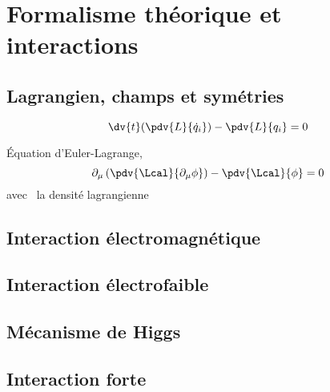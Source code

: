 \section{Formalisme théorique et interactions}
\subsection{Lagrangien, champs et symétries}
\begin{equation}
\dv{t}(\pdv{L}{\dot{q}_i})-\pdv{L}{q_i}=0
\end{equation}

Équation d'Euler-Lagrange,
\begin{equation}
\partial_\mu\left(\pdv{\Lcal}{\partial_\mu \phi} \right) - \pdv{\Lcal}{\phi}=0
\end{equation}
avec \Lcal\ la densité lagrangienne
\subsection{Interaction électromagnétique}
\subsection{Interaction électrofaible}
\subsection{Mécanisme de Higgs}
\subsection{Interaction forte}
